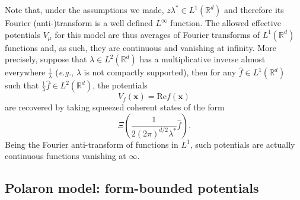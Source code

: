 \documentclass[11pt,a4paper,reqno]{amsart}
\renewcommand{\Re}{\mathrm{Re}}
\theoremstyle{definition}
\numberwithin{equation}{section}
\newcommand{\bdm}{\begin{displaymath}}
\newcommand{\edm}{\end{displaymath}}
\newcommand{\tx}{\textstyle}
\newcommand{\lf}{\left}
\newcommand{\ri}{\right}
\newcommand{\xv}{\mathbf{x}}
\newcommand{\R}{\mathbb{R}}
\begin{document}
Note that, under the assumptions we made, $ z \lambda^{*} \in L^1(\R^d) $ and therefore its Fourier (anti-)transform is a well defined $ L^{\infty} $ function. The allowed effective potentials $ V_{\mu}$ for this model are thus averages of Fourier transforms of $L^1 (\R^d )$ functions and, as such, they are continuous and vanishing at infinity. More precisely, suppose that $\lambda\in L^2 (\R^d )$ has a
multiplicative inverse almost everywhere $\frac{1}{\lambda}$ ({\it e.g.}, $\lambda$ is
not compactly supported), then for any $ \hat{f} \in L^1 (\R^d )$
such that $\frac{1}{\lambda} \hat{f} \in L^2 (\R^d )$, the potentials
\begin{equation}
  	\label{eq:28}
 	V_f(\xv)= \Re  f(\xv)
\end{equation}
are recovered by taking squeezed coherent states of the form 
\bdm
	\Xi\lf(\tx\frac{1}{2(2\pi)^{d/2} \lambda^{*}} \hat{f} \ri).
\edm
Being the Fourier anti-transform of functions in $ L^1 $, such potentials are actually continuous functions vanishing at $ \infty $.

\subsection{Polaron model: form-bounded potentials}
\label{sec:polaron}
\end{document}
